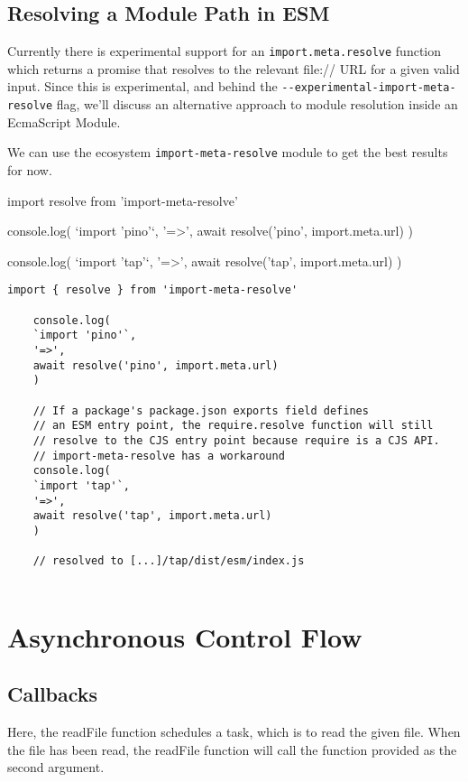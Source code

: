 \documentclass{scrartcl}
\begin{document}
\subsection{Resolving a Module Path in ESM}

Currently there is experimental support for an \lstinline|import.meta.resolve| function which returns a promise that resolves to the relevant file:// URL for a given valid input. Since this is experimental, and behind the \lstinline|--experimental-import-meta-resolve| flag, we'll discuss an alternative approach to module resolution inside an EcmaScript Module.

We can use the ecosystem \lstinline|import-meta-resolve| module to get the best results for now.

import { resolve } from 'import-meta-resolve'

console.log(
`import 'pino'`,
'=>',
await resolve('pino', import.meta.url)
)

console.log(
`import 'tap'`,
'=>',
await resolve('tap', import.meta.url)
)





\begin{lstlisting}[style=ES6]
    import { resolve } from 'import-meta-resolve'

    console.log(
    `import 'pino'`,
    '=>',
    await resolve('pino', import.meta.url)
    )

    // If a package's package.json exports field defines
    // an ESM entry point, the require.resolve function will still
    // resolve to the CJS entry point because require is a CJS API.
    // import-meta-resolve has a workaround
    console.log(
    `import 'tap'`,
    '=>',
    await resolve('tap', import.meta.url)
    )

    // resolved to [...]/tap/dist/esm/index.js


\end{lstlisting}

\section{ Asynchronous Control Flow }

\subsection{Callbacks}

Here, the readFile function schedules a task, which is to read the given file. When the file has been read, the readFile function will call the function provided as the second argument.
\end{document}
